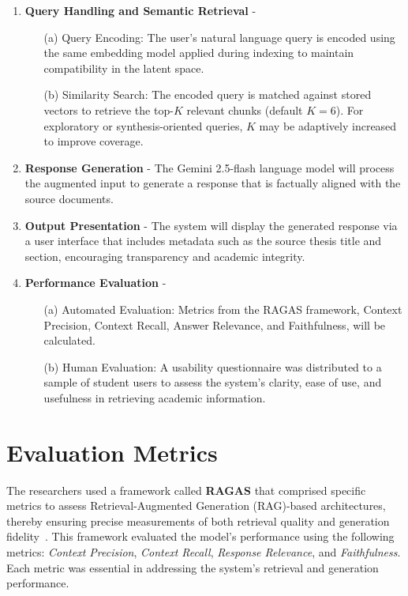 \begin{refsection}
\begin{enumerate}
    \item \textbf{Query Handling and Semantic Retrieval} - 
        \begin{enumerate}
            \item [(a)] {Query Encoding:} The user’s natural language query is encoded using the same embedding model applied during indexing to maintain compatibility in the latent space.
            \item [(b)] {Similarity Search:} The encoded query is matched against stored vectors to retrieve the top-$K$ relevant chunks (default $K=6$). For exploratory or synthesis-oriented queries, $K$ may be adaptively increased to improve coverage.
        \end{enumerate}

    \item \textbf{Response Generation} - The Gemini 2.5-flash language model will process the augmented input to generate a response that is factually aligned with the source documents.

    \item \textbf{Output Presentation} - The system will display the generated response via a user interface that includes metadata such as the source thesis title and section, encouraging transparency and academic integrity.

    \item \textbf{Performance Evaluation} - 
        \begin{enumerate}
            \item [(a)] {Automated Evaluation:} Metrics from the RAGAS framework, Context Precision, Context Recall, Answer Relevance, and Faithfulness, will be calculated.
            \item [(b)] {Human Evaluation:} A usability questionnaire was distributed to a sample of student users to assess the system’s clarity, ease of use, and usefulness in retrieving academic information.
        \end{enumerate}

\end{enumerate}


\section{Evaluation Metrics}

The researchers used a framework called \textbf{RAGAS} that comprised specific metrics to assess Retrieval-Augmented Generation (RAG)-based architectures, thereby ensuring precise measurements of both retrieval quality and generation fidelity~\cite{oubah2024advanced}. This framework evaluated the model's performance using the following metrics: \textit{Context Precision}, \textit{Context Recall}, \textit{Response Relevance}, and \textit{Faithfulness}. Each metric was essential in addressing the system’s retrieval and generation performance.


\end{refsection}
